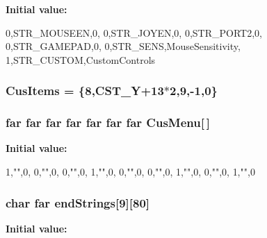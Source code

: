 \label{WL__MENU_8C_a9bb024a29eb8f889628f83ebfce7ee3e}
{\bfseries Initial value:}
\begin{DoxyCode}

{








        {0,STR_MOUSEEN,0},
        {0,STR_JOYEN,0},
        {0,STR_PORT2,0},
        {0,STR_GAMEPAD,0},
        {0,STR_SENS,MouseSensitivity},
        {1,STR_CUSTOM,CustomControls}

}
\end{DoxyCode}
\hypertarget{WL__MENU_8C_a30fed5772336d6185ad27e183642b26e}{
\subsubsection[{CusItems}]{ {\bf CusItems} = \{8,CST\_\-Y+13$\ast$2,9,-\/1,0\}}}
\label{WL__MENU_8C_a30fed5772336d6185ad27e183642b26e}
\hypertarget{WL__MENU_8C_a955cb28792558e0cffd3eb880bc17b23}{
\subsubsection[{CusMenu}]{ far far far far far far far {\bf CusMenu}\mbox{[}$\,$\mbox{]}}}
\label{WL__MENU_8C_a955cb28792558e0cffd3eb880bc17b23}
{\bfseries Initial value:}
\begin{DoxyCode}

{
        {1,"",0},
        {0,"",0},
        {0,"",0},
        {1,"",0},
        {0,"",0},
        {0,"",0},
        {1,"",0},
        {0,"",0},
        {1,"",0}
}
\end{DoxyCode}
\hypertarget{WL__MENU_8C_a8e30ff9c9e815ba886bfde0ef75be6d8}{
\subsubsection[{endStrings}]{\setlength{\rightskip}{0pt plus 5cm}char far {\bf endStrings}\mbox{[}9\mbox{]}\mbox{[}80\mbox{]}}}
\label{WL__MENU_8C_a8e30ff9c9e815ba886bfde0ef75be6d8}
{\bfseries Initial value:}
